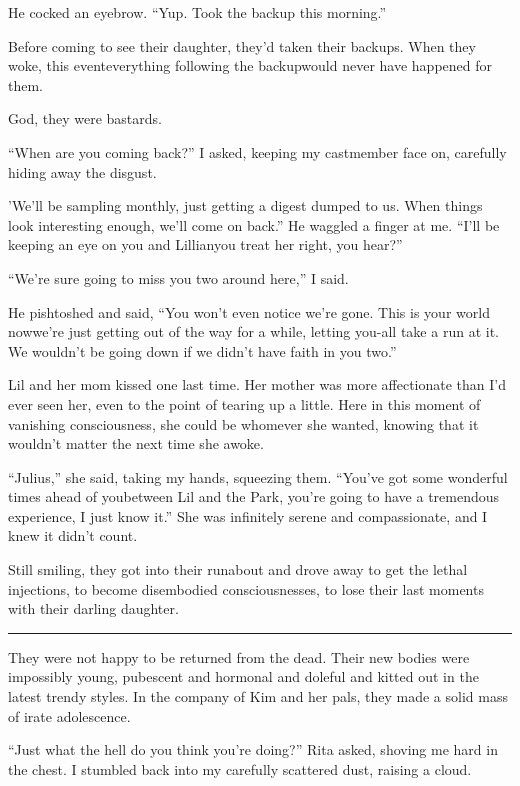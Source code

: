 He cocked an eyebrow. “Yup. Took the backup this morning.”

Before coming to see their daughter, they'd taken their backups.
When they woke, this event{\dash}everything following the backup{\dash}would
never have happened for them.

God, they were bastards.

“When are you coming back?” I asked, keeping my castmember face on,
carefully hiding away the disgust.

'We'll be sampling monthly, just getting a digest dumped to us.
When things look interesting enough, we'll come on back.” He
waggled a finger at me. “I'll be keeping an eye on you and
Lillian{\dash}you treat her right, you hear?”

“We're sure going to miss you two around here,” I said.

He pishtoshed and said, “You won't even notice we're gone. This is
your world now{\dash}we're just getting out of the way for a while,
letting you-all take a run at it. We wouldn't be going down if we
didn't have faith in you two.”

Lil and her mom kissed one last time. Her mother was more
affectionate than I'd ever seen her, even to the point of tearing
up a little. Here in this moment of vanishing consciousness, she
could be whomever she wanted, knowing that it wouldn't matter the
next time she awoke.

“Julius,” she said, taking my hands, squeezing them. “You've got
some wonderful times ahead of you{\dash}between Lil and the Park, you're
going to have a tremendous experience, I just know it.” She was
infinitely serene and compassionate, and I knew it didn't count.

Still smiling, they got into their runabout and drove away to get
the lethal injections, to become disembodied consciousnesses, to
lose their last moments with their darling daughter.

\begin{center}\rule{3in}{0.4pt}\end{center}

They were not happy to be returned from the dead. Their new bodies
were impossibly young, pubescent and hormonal and doleful and
kitted out in the latest trendy styles. In the company of Kim and
her pals, they made a solid mass of irate adolescence.

“Just what the hell do you think you're doing?” Rita asked, shoving
me hard in the chest. I stumbled back into my carefully scattered
dust, raising a cloud.

